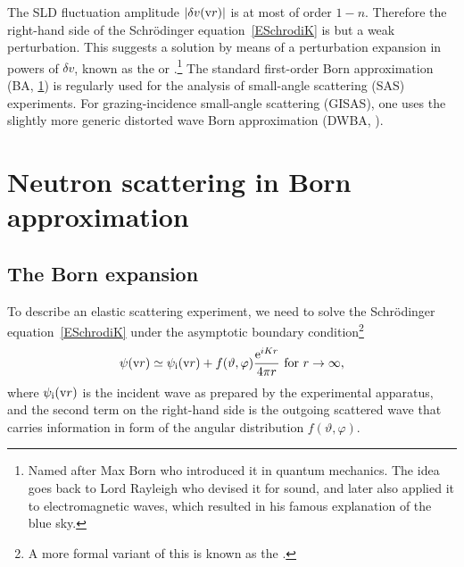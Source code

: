 The SLD fluctuation amplitude $|\delta v(\text{v}{r})|$ is at most of order $1-n$.
Therefore the right-hand side of the Schrödinger equation~\cref{ESchrodiK}
is but a weak perturbation.
This suggests a solution
by means of a perturbation expansion in powers of $\delta v$,
%
known as the  or .\footnote{
Named after Max Born
who introduced it in quantum mechanics.
The idea goes back to Lord Rayleigh
who devised it for sound,
and later also applied it to electromagnetic waves,
which resulted in his famous explanation of the blue sky.}
The standard first-order Born approximation (BA, \cref{SBornApprox})
is regularly used  for the analysis of small-angle scattering (SAS) experiments.
%
%
%
For grazing-incidence small-angle scattering (GISAS),
one uses the slightly more generic distorted wave Born approximation (DWBA, ).
%

%
%

\section{Neutron scattering in Born approximation}\label{SBornApprox}

\subsection{The Born expansion}\label{SBornExpans}

%
%

To describe an elastic scattering experiment,
we need to solve the Schrödinger equation~\cref{ESchrodiK}
under the asymptotic boundary condition\footnote
{A more formal variant of this is known as the .%
%
%
}
%
\begin{equation}\label{Escabouco}
  \psi(\text{v}{r})
  \simeq \psi_{\text{i}}(\text{v}{r}) + f(\vartheta,\varphi)\frac{\mathrm e^{iKr}}{4\pi r}
  \text{~for~}r\to\infty,
\end{equation}
%
%
%
where $\psi_{\text{i}}(\text{v}{r})$ is the incident wave
as prepared by the experimental apparatus,
and the second term on the right-hand side is
the outgoing scattered wave
that carries information in form of the angular distribution
$f(\vartheta,\varphi)$.

